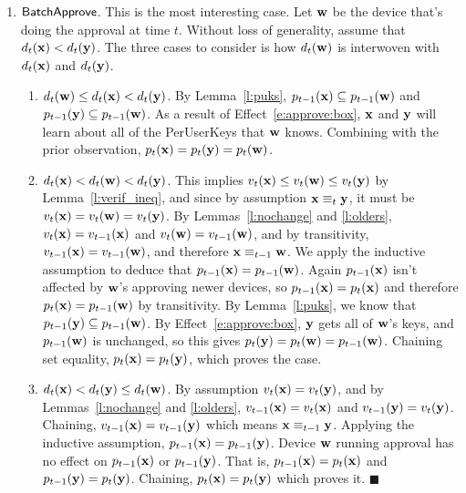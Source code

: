\begin{enumerate}
\item $\mathsf{BatchApprove}${}. This is the most interesting case. Let $\mathbf{w}$ be the device that's
  doing the approval at time $t$. Without loss of generality, assume that $d_{t}(\mathbf{x}) <
  d_{t}(\mathbf{y})$. The three cases to consider is how $d_{t}(\mathbf{w})$ is interwoven with
  $d_{t}(\mathbf{x})$ and $d_{t}(\mathbf{y})$.
  \begin{enumerate}
  \item $d_{t}(\mathbf{w}) \le d_{t}(\mathbf{x}) < d_{t}(\mathbf{y})$. By Lemma~\ref{l:puks},
    $p_{t-1}(\mathbf{x}) \subseteq p_{t-1}(\mathbf{w})$ and $p_{t-1}(\mathbf{y}) \subseteq p_{t-1}(\mathbf{w})$. As
    a result of Effect~\ref{e:approve:box}, $\mathbf{x}$ and $\mathbf{y}$ will learn about all of the
    PerUserKeys that $\mathbf{w}$ knows. Combining with the prior observation, $p_{t}(\mathbf{x}) =
    p_{t}(\mathbf{y}) = p_{t}(\mathbf{w})$.
  \item $d_{t}(\mathbf{x}) < d_{t}(\mathbf{w}) < d_{t}(\mathbf{y})$. This implies $v_{t}(\mathbf{x}) \leq
    v_{t}(\mathbf{w}) \leq v_{t}(\mathbf{y})$ by Lemma~\ref{l:verif_ineq}, and since by assumption
    $\mathbf{x} \equiv_{t} \mathbf{y}$, it must be $v_{t}(\mathbf{x}) = v_{t}(\mathbf{w}) = v_{t}(\mathbf{y})$.
    By Lemmas~\ref{l:nochange} and \ref{l:olders},  
    $v_{t}(\mathbf{x}) = v_{t-1}(\mathbf{x})$ and $v_{t}(\mathbf{w}) = v_{t-1}(\mathbf{w})$, and by
    transitivity, $v_{t-1}(\mathbf{x}) = v_{t-1}(\mathbf{w})$, and therefore $\mathbf{x} \equiv_{t-1}
    \mathbf{w}$. We apply the inductive assumption to deduce that $p_{t-1}(\mathbf{x}) = p_{t-1}(\mathbf{w})$.
    Again $p_{t-1}(\mathbf{x})$ isn't affected by $\mathbf{w}$'s approving newer devices, so
    $p_{t-1}(\mathbf{x}) = p_{t}(\mathbf{x})$ and therefore $p_{t}(\mathbf{x}) = p_{t-1}(\mathbf{w})$ by
    transitivity. By Lemma~\ref{l:puks}, we know that $p_{t-1}(\mathbf{y}) \subseteq p_{t-1}(\mathbf{w})$.
    By Effect~\ref{e:approve:box}, $\mathbf{y}$ gets all of $\mathbf{w}$'s keys, and $p_{t-1}(\mathbf{w})$
    is unchanged, so this gives $p_{t}(\mathbf{y}) = p_{t}(\mathbf{w}) = p_{t-1}(\mathbf{w})$. Chaining set
    equality, $p_{t}(\mathbf{x}) = p_{t}(\mathbf{y})$, which proves the case.
  \item $d_{t}(\mathbf{x}) < d_{t}(\mathbf{y}) \le d_{t}(\mathbf{w})$. By assumption $v_{t}(\mathbf{x}) =
    v_{t}(\mathbf{y})$, and by Lemmas~\ref{l:nochange} and \ref{l:olders}, $v_{t-1}(\mathbf{x}) =
    v_{t}(\mathbf{x})$ and $v_{t-1}(\mathbf{y}) = v_{t}(\mathbf{y})$. Chaining, $v_{t-1}(\mathbf{x}) =
    v_{t-1}(\mathbf{y})$ which means $\mathbf{x} \equiv_{t-1} \mathbf{y}$. Applying the inductive
    assumption, $p_{t-1}(\mathbf{x}) = p_{t-1}(\mathbf{y})$. Device $\mathbf{w}$ running approval has no
    effect on $p_{t-1}(\mathbf{x})$ or $p_{t-1}(\mathbf{y})$. That is, $p_{t-1}(\mathbf{x}) = p_{t}(\mathbf{x})$ and
    $p_{t-1}(\mathbf{y}) = p_{t}(\mathbf{y})$. Chaining, $p_{t}(\mathbf{x}) = p_{t}(\mathbf{y})$ which proves it.
    $\blacksquare$
  \end{enumerate}
\end{enumerate}
